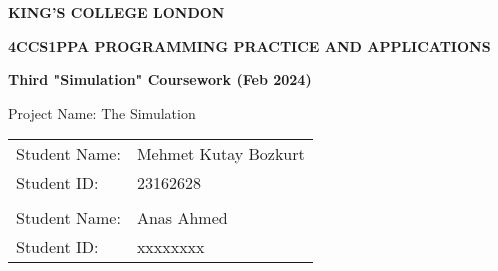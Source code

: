 \documentclass[12pt, a4paper]{scrartcl}
\begin{document}

\begin{titlepage}
  \begin{center}
    \LARGE
      \textbf{KING'S COLLEGE LONDON}

      \vspace{2cm}

      \begin{adjustwidth}{-1cm}{-1cm}
        \centering
        \Large
        \textbf{4CCS1PPA PROGRAMMING PRACTICE AND APPLICATIONS}
      \end{adjustwidth}
      
      \vspace{0.5cm}

      \Large
      \textbf{Third "Simulation" Coursework (Feb 2024)}

      \vspace{2cm}

      \Large
      Project Name: The Simulation 

      \vspace{1cm}

      \Large
      \begin{tabular}{l l}
        Student Name: & Mehmet Kutay Bozkurt \\
        Student ID: & 23162628 \\
        \vspace{0.5cm} & \\
        Student Name: & Anas Ahmed \\
        Student ID: & xxxxxxxx
      \end{tabular}
  \end{center}
\end{titlepage}
\end{document}
